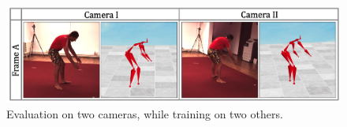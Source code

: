 \begin{figure}[tbh]
\centering
\setlength{\abovecaptionskip}{0pt plus 3pt minus 2pt}
\setlength{\belowcaptionskip}{-10pt plus 3pt minus 2pt}
\caption*{}

\includegraphics[width=.9\linewidth]{./images/rebutall_2cams_b.png}

\setlength{\abovecaptionskip}{-10pt plus 3pt minus 2pt}
\setlength{\belowcaptionskip}{-20pt plus 3pt minus 2pt}

\caption{
Evaluation on two cameras, while training on two others.}
\label{fig:general}

\end{figure}